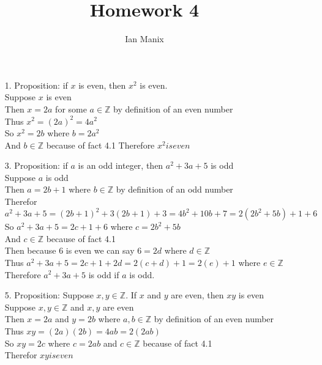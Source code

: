 \documentclass[sigconf]{article}
\title{
  \textbf{Homework 4} \\
  }
\author{ 
  Ian Manix
  }
\begin{document}



\maketitle





\begin{itemize}
  \item[1.] Proposition: if $x$ is even, then $x^2$ is even.\\
            Suppose $x$ is even \\
            Then $x=2a$ for some $a\in \mathbb{Z}$ by definition of an even number \\
            Thus $x^{2}=(2a)^2=4a^2$ \\
            So $x^2=2b$ where $b=2a^2$ \\
            And $b\in \mathbb{Z}$ because of fact 4.1
            Therefore $x^2 is even$\\

  \item[3.] Proposition: if $a$ is an odd integer, then $a^{2}+3a+5$ is odd\\
            Suppose $a$ is odd \\
            Then $a=2b+1$ where $b\in \mathbb{Z}$ by definition of an odd number\\
            Therefor $a^{2}+3a+5=(2b+1)^2+3(2b+1)+3=4b^{2}+10b+7=2(2b^{2}+5b)+1+6$\\
            So $a^{2}+3a+5=2c+1+6$ where $c=2b^{2}+5b$ \\
            And $c \in \mathbb{Z}$ because of fact 4.1 \\
            Then because 6 is even we can say $6=2d$ where $d\in \mathbb{Z}$\\
            Thus $a^{2}+3a+5=2c+1+2d=2(c+d)+1=2(e)+1$ where $e\in \mathbb{Z}$\\
            Therefore $a^{2}+3a+5$ is odd if $a$ is odd.\\

  \item[5.] Proposition: Suppose $x,y\in \mathbb{Z}$. If $x$ and $y$ are even, then $xy$ is even\\
            Suppose $x,y\in \mathbb{Z}$ and $x,y$ are even \\
            Then $x=2a$ and $y=2b$ where $a,b \in \mathbb{Z}$ by definition of an even number\\
            Thus $xy=(2a)(2b)=4ab=2(2ab)$\\
            So $xy=2c$ where $c=2ab$ and $c\in \mathbb{Z}$ because of fact 4.1\\
            Therefor $xy is even$\\


\end{itemize}
\end{document}
